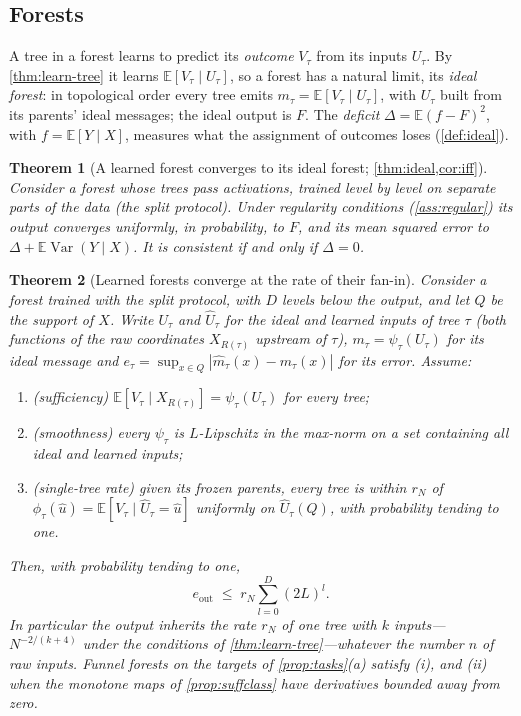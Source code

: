 \documentclass[11pt]{article}
\newtheorem{theorem}{Theorem}
\theoremstyle{definition}
\theoremstyle{remark}
\newcommand{\E}{\mathbb{E}}
\newcommand{\Var}{\operatorname{Var}}
\begin{document}
\subsection{Forests}

A tree in a forest learns to predict its \emph{outcome} $V_\tau$ from its inputs $U_\tau$.
By \cref{thm:learn-tree} it learns $\E[V_\tau\mid U_\tau]$, so a forest has a natural limit,
its \emph{ideal forest}: in topological order every tree emits $m_\tau=\E[V_\tau\mid U_\tau]$,
with $U_\tau$ built from its parents' ideal messages; the ideal output is $F$.  The
\emph{deficit} $\Delta=\E(f-F)^2$, with $f=\E[Y\mid X]$, measures what the assignment of
outcomes loses (\cref{def:ideal}).

\begin{theorem}[A learned forest converges to its ideal forest; \cref{thm:ideal,cor:iff}]\label{thm:learn-forest}
Consider a forest whose trees pass activations, trained level by level on separate parts
of the data (the split protocol).  Under regularity conditions (\cref{ass:regular}) its
output converges uniformly, in probability, to $F$, and its mean squared error to
$\Delta+\E\Var(Y\mid X)$.  It is consistent if and only if $\Delta=0$.
\end{theorem}

\begin{theorem}[Learned forests converge at the rate of their fan-in]\label{thm:learn-rate}
Consider a forest trained with the split protocol, with $D$ levels below the output, and
let $Q$ be the support of $X$.  Write $U_\tau$ and $\hat U_\tau$ for the ideal and learned
inputs of tree $\tau$ (both functions of the raw coordinates $X_{R(\tau)}$ upstream of
$\tau$), $m_\tau=\psi_\tau(U_\tau)$ for its ideal message and
$e_\tau=\sup_{x\in Q}|\hat m_\tau(x)-m_\tau(x)|$ for its error.  Assume:
\begin{enumerate}[label=(\roman*),leftmargin=*,noitemsep]
\item (sufficiency) $\E[V_\tau\mid X_{R(\tau)}]=\psi_\tau(U_\tau)$ for every tree;
\item (smoothness) every $\psi_\tau$ is $L$-Lipschitz in the max-norm on a set containing
  all ideal and learned inputs;
\item (single-tree rate) given its frozen parents, every tree is within $r_N$ of
  $\phi_\tau(\hat u)=\E[V_\tau\mid\hat U_\tau=\hat u]$ uniformly on $\hat U_\tau(Q)$, with
  probability tending to one.
\end{enumerate}
Then, with probability tending to one,
\[
  e_{\text{out}}\;\le\;r_N\sum_{l=0}^{D}(2L)^l .
\]
In particular the output inherits the rate $r_N$ of one tree with $k$ inputs---$N^{-2/(k+4)}$
under the conditions of \cref{thm:learn-tree}---whatever the number $n$ of raw inputs.
Funnel forests on the targets of \cref{prop:tasks}(a) satisfy (i), and (ii) when the
monotone maps of \cref{prop:suffclass} have derivatives bounded away from zero.
\end{theorem}
\end{document}
